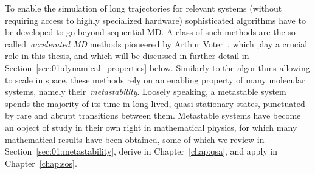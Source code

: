 To enable the simulation of long trajectories for relevant systems (without requiring access to highly specialized hardware) sophisticated algorithms have to be developed to go beyond sequential MD. A class of such methods are the so-called~\textit{accelerated MD} methods pioneered by Arthur Voter~\cite{V97,V98,SV00}, which play a crucial role in this thesis, and which will be discussed in further detail in Section~\ref{sec:01:dynamical_properties} below.
Similarly to the algorithms allowing to scale in space, these methods rely on an enabling property of many molecular systems, namely their~\textit{metastability}. Loosely speaking, a metastable system spends the majority of its time in long-lived, quasi-stationary states, punctuated by rare and abrupt transitions between them.
Metastable systems have become an object of study in their own right in mathematical physics, for which many mathematical results have been obtained, some of which we review in Section~\ref{sec:01:metastability}, derive in Chapter~\ref{chap:qsa}, and apply in Chapter~\ref{chap:sos}.

